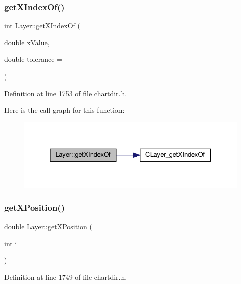 \subsubsection{\texorpdfstring{get\+X\+Index\+Of()}{getXIndexOf()}}
{\footnotesize\ttfamily int Layer\+::get\+X\+Index\+Of (\begin{DoxyParamCaption}\item[{double}]{x\+Value,  }\item[{double}]{tolerance = {} }\end{DoxyParamCaption})\hspace{0.3cm}{\ttfamily [inline]}}



Definition at line 1753 of file chartdir.\+h.

Here is the call graph for this function\+:
\nopagebreak
\begin{figure}[H]
\begin{center}
\leavevmode
\includegraphics[width=325pt]{class_layer_a6d450eda89af1922a7223ee02e00af95_cgraph}
\end{center}
\end{figure}
\mbox{\label{class_layer_a9366bceb749abf3702fe6cc83a436da1}} 
\subsubsection{\texorpdfstring{get\+X\+Position()}{getXPosition()}}
{\footnotesize\ttfamily double Layer\+::get\+X\+Position (\begin{DoxyParamCaption}\item[{int}]{i }\end{DoxyParamCaption})\hspace{0.3cm}{\ttfamily [inline]}}



Definition at line 1749 of file chartdir.\+h.

